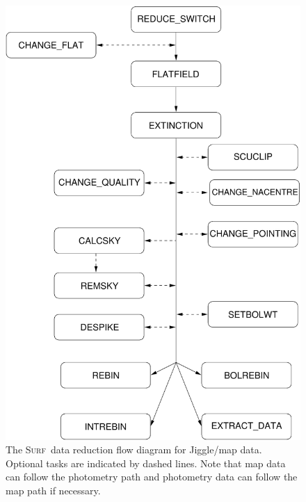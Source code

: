 \documentclass[twoside,11pt]{starlink}
\providecommand{\scusoft}          {\textsc{Surf}}
\begin{document}
\begin{figure}
\begin{center}
\includegraphics[width=5in]{sun216_flow_jig}
\end{center}
\caption{The \scusoft\ data reduction flow diagram for Jiggle/map
data. Optional tasks are
indicated by dashed lines. Note that map data can follow the photometry
path and photometry data can follow the map path if necessary.
}
\label{flowpath_jig}
\end{figure}
\end{document}
